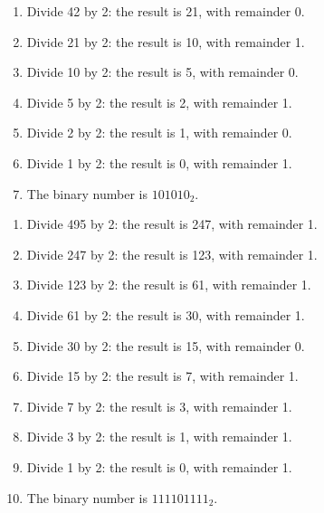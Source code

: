 \documentclass[12pt]{extarticle}
\begin{document}

\begin{enumerate}[itemsep=-2mm]
\item Divide 42 by 2: the result is 21, with remainder 0.
\item Divide 21 by 2: the result is 10, with remainder 1.
\item Divide 10 by 2: the result is 5, with remainder 0.
\item Divide 5 by 2: the result is 2, with remainder 1.
\item Divide 2 by 2: the result is 1, with remainder 0.
\item Divide 1 by 2: the result is 0, with remainder 1.
\item The binary number is $101010_2$.
\end{enumerate}

\begin{enumerate}[itemsep=-2mm]
\item Divide 495 by 2: the result is 247, with remainder 1.
\item Divide 247 by 2: the result is 123, with remainder 1.
\item Divide 123 by 2: the result is 61, with remainder 1.
\item Divide 61 by 2: the result is 30, with remainder 1.
\item Divide 30 by 2: the result is 15, with remainder 0.
\item Divide 15 by 2: the result is 7, with remainder 1.
\item Divide 7 by 2: the result is 3, with remainder 1.
\item Divide 3 by 2: the result is 1, with remainder 1.
\item Divide 1 by 2: the result is 0, with remainder 1.
\item The binary number is $111101111_2$.
\end{enumerate}

\end{document}

